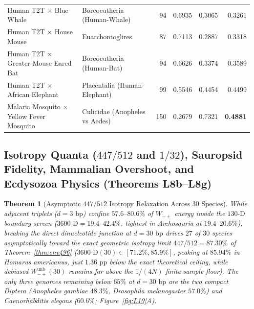 \documentclass[11pt,a4paper]{article}
\renewcommand{\_}{\origunderscore\penalty200\relax}
\newtheorem{theorem}{Theorem}[section]
\theoremstyle{remark}
\begin{document}
\begin{table}[H]
{\begin{tabular}{llrrrr}
Human T2T $\times$ Blue Whale & Boreoeutheria (Human-Whale) & 94 & 0.6935 & 0.3065 & 0.3261 \\
Human T2T $\times$ House Mouse & Euarchontoglires & 87 & 0.7113 & 0.2887 & 0.3318 \\
Human T2T $\times$ Greater Mouse Eared Bat & Boreoeutheria (Human-Bat) & 94 & 0.6626 & 0.3374 & 0.3589 \\
Human T2T $\times$ African Elephant & Placentalia (Human-Elephant) & 99 & 0.5546 & 0.4454 & 0.4499 \\
Malaria Mosquito $\times$ Yellow Fever Mosquito & Culicidae (Anopheles vs Aedes) & 150 & 0.2679 & 0.7321 & \textbf{0.4881} \\
\bottomrule
\end{tabular}}
\end{table}

\subsection{Isotropy Quanta (\texorpdfstring{$447/512$}{447/512} and \texorpdfstring{$1/32$}{1/32}), Sauropsid Fidelity, Mammalian Overshoot, and Ecdysozoa Physics (Theorems L8b--L8g)}
\begin{theorem}[Asymptotic $447/512$ Isotropy Relaxation Across 30 Species]
\label{thm:L8b}
While adjacent triplets ($d=3\text{ bp}$) confine $57.6\text{--}80.6\%$ of $W_{-+}$ energy inside the $130\text{-D}$ boundary screen ($\mathrm{3600\text{-}D} = 19.4\text{--}42.4\%$, tightest in Archosauria at $19.4\text{--}20.6\%$), breaking the direct dinucleotide junction at $d=30\text{ bp}$ drives $27$ of $30$ species asymptotically toward the exact geometric isotropy limit $447/512 = 87.30\%$ of Theorem~\ref{thm:env496} ($\mathrm{3600\text{-}D}(30) \in [71.2\%, 85.9\%]$, peaking at $85.94\%$ in \textit{Homarus americanus}, just $1.36\text{ pp}$ below the exact theoretical ceiling, while debiased $W_{-+}^{\mathrm{unb}}(30)$ remains far above the $1/(4N)$ finite-sample floor). The only three genomes remaining below $65\%$ at $d=30\text{ bp}$ are the two compact Diptera (\textit{Anopheles gambiae} $48.3\%$, \textit{Drosophila melanogaster} $57.0\%$) and \textit{Caenorhabditis elegans} ($60.6\%$; Figure~\ref{fig:L10}A).
\end{theorem}
\end{document}
